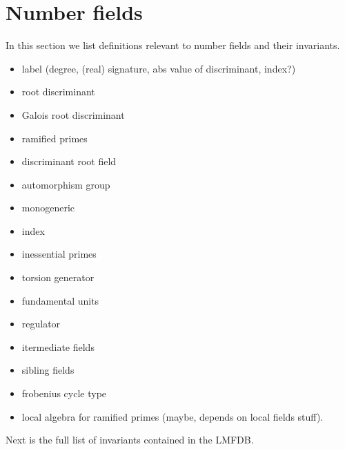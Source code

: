 
\section{Number fields}

In this section we list definitions relevant to number fields and their invariants.
\begin{itemize}
    \item label (degree, (real) signature, abs value of discriminant, index?)
    \item root discriminant
    \item Galois root discriminant
    \item ramified primes
    \item discriminant root field
    \item automorphism group
    \item monogeneric
    \item index
    \item inessential primes
    \item torsion generator
    \item fundamental units
    \item regulator
    \item itermediate fields
    \item sibling fields
    \item frobenius cycle type
    \item local algebra for ramified primes (maybe, depends on local fields stuff).
    \end{itemize}

Next is the full list of invariants contained in the LMFDB.

